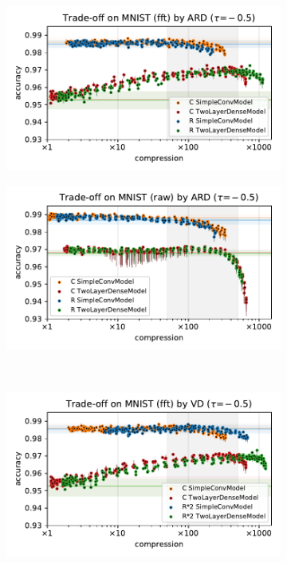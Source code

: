 \documentclass[a4paper,10pt,onecolumn]{article}
\begin{document}
\begin{figure}[b]
  \begin{subfigure}[b]{0.5\columnwidth}
    \centering
    \includegraphics[width=\columnwidth]{figure__mnist-like__trade-off/appendix__ARD__mnist__fft__-0.5.pdf}
  \end{subfigure}%
  \begin{subfigure}[b]{0.5\columnwidth}
    \centering
    \includegraphics[width=\columnwidth]{figure__mnist-like__trade-off/appendix__ARD__mnist__raw__-0.5.pdf}
  \end{subfigure} \\%
  \begin{subfigure}[b]{0.5\columnwidth}
    \centering
    \includegraphics[width=\columnwidth]{figure__mnist-like__trade-off/appendix__cmp__VD__mnist__fft__-0.5.pdf}

\end{subfigure}
\end{figure}
\end{document}
